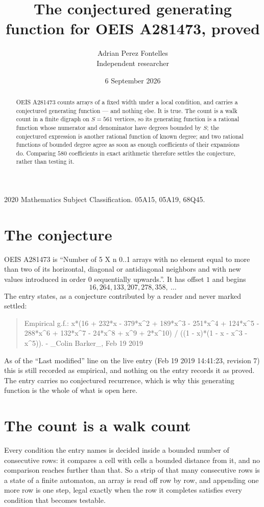 \documentclass[11pt,a4paper]{article}
\title{The conjectured generating function for OEIS A281473, proved}
\author{Adrian Perez Fontelles\\ \small Independent researcher}
\date{6 September 2026}
\theoremstyle{plain}
\theoremstyle{definition}
\begin{document}
\maketitle

\begin{abstract}
OEIS A281473 counts arrays of a fixed width under a local condition, and carries a conjectured
generating function --- and nothing else. It is true. The count is a walk count in a finite
digraph on $S=561$ vertices, so its generating function is a rational function whose numerator
and denominator have degrees bounded by $S$; the conjectured expression is another rational
function of known degree; and two rational functions of bounded degree agree as soon as enough
coefficients of their expansions do. Comparing $580$ coefficients in exact arithmetic
therefore settles the conjecture, rather than testing it.
\end{abstract}

\noindent\small 2020 Mathematics Subject Classification. 05A15, 05A19, 68Q45.\normalsize

\section{The conjecture}

OEIS A281473 is ``Number of 5 X n  0..1 arrays with no element equal to more than two of its horizontal, diagonal or antidiagonal neighbors and with new values introduced in order 0 sequentially upwards.''. It has offset $1$ and begins
\[
16, 264, 133, 207, 278, 358,\ \dots
\]
The entry states, as a conjecture contributed by a reader and never marked settled:
\begin{quote}
Empirical g.f.: x*(16 + 232*x - 379*x\^{}2 + 189*x\^{}3 - 251*x\^{}4 + 124*x\^{}5 - 288*x\^{}6 + 132*x\^{}7 - 24*x\^{}8 + x\^{}9 + 2*x\^{}10) / ((1 - x)*(1 - x - x\^{}3 - x\^{}5)). - \_Colin Barker\_, Feb 19 2019
\end{quote}
As of the ``Last modified'' line on the live entry (Feb 19 2019 14:41:23, revision 7) this is still
recorded as empirical, and nothing on the entry records it as proved. The entry carries no
conjectured recurrence, which is why this generating function is the whole of what is open
here.

\section{The count is a walk count}

Every condition the entry names is decided inside a bounded number of consecutive rows: it
compares a cell with cells a bounded distance from it, and no comparison reaches further than
that. So a strip of that many consecutive rows is a state of a finite automaton, an array is
read off row by row, and appending one more row is one step, legal exactly when the row it
completes satisfies every condition that becomes testable.
\end{document}
